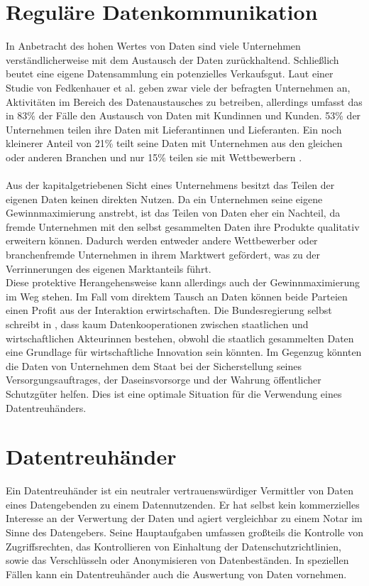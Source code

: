 \documentclass{scrreprt}
\begin{document}
\section{Reguläre Datenkommunikation}
In Anbetracht des hohen Wertes von Daten sind viele Unternehmen verständlicherweise mit dem Austausch der Daten zurückhaltend. Schließlich beutet eine eigene Datensammlung ein potenzielles Verkaufsgut. Laut einer Studie von Fedkenhauer et al. geben zwar viele der befragten Unternehmen an, Aktivitäten im Bereich des Datenaustausches zu betreiben, allerdings umfasst das in 83\% der Fälle den Austausch von Daten mit Kundinnen und Kunden. 53\% der Unternehmen teilen ihre Daten mit Lieferantinnen und Lieferanten. Ein noch kleinerer Anteil von 21\% teilt seine Daten mit Unternehmen aus den gleichen oder anderen Branchen und nur 15\% teilen sie mit Wettbewerbern \cite{dt-fedkenhauer2017datenaustausch}. \\\\
Aus der kapitalgetriebenen Sicht eines Unternehmens besitzt das Teilen der eigenen Daten keinen direkten Nutzen. Da ein Unternehmen seine eigene Gewinnmaximierung anstrebt, ist das Teilen von Daten eher ein Nachteil, da fremde Unternehmen mit den selbst gesammelten Daten ihre Produkte qualitativ erweitern können. Dadurch werden entweder andere Wettbewerber oder branchenfremde Unternehmen in ihrem Marktwert gefördert, was zu der Verrinnerungen des eigenen Marktanteils führt. \\
Diese protektive Herangehensweise kann allerdings auch der Gewinnmaximierung im Weg stehen. Im Fall vom direktem Tausch an Daten können beide Parteien einen Profit aus der Interaktion erwirtschaften. Die Bundesregierung selbst schreibt in \cite{dt-bundesregierung2021datenstrategie}, dass kaum Datenkooperationen zwischen staatlichen und wirtschaftlichen Akteurinnen bestehen, obwohl die staatlich gesammelten Daten eine Grundlage für wirtschaftliche Innovation sein könnten. Im Gegenzug könnten die Daten von Unternehmen dem Staat bei der Sicherstellung seines Versorgungsauftrages, der Daseinsvorsorge und der Wahrung öffentlicher Schutzgüter helfen. Dies ist eine optimale Situation für die Verwendung eines Datentreuhänders.
\section{Datentreuhänder}
\label{sec:dt}
Ein Datentreuhänder ist ein neutraler vertrauenswürdiger Vermittler von Daten eines Datengebenden zu einem Datennutzenden. Er hat selbst kein kommerzielles Interesse an der Verwertung der Daten und agiert vergleichbar zu einem Notar im Sinne des Datengebers. Seine Hauptaufgaben umfassen großteils die Kontrolle von Zugriffsrechten, das Kontrollieren von Einhaltung der Datenschutzrichtlinien, sowie das Verschlüsseln oder Anonymisieren von Datenbeständen. In speziellen Fällen kann ein Datentreuhänder auch die Auswertung von Daten vornehmen. \cite{dt-bundesregierung2021datenstrategie}\cite{dt-richter2020ddvtalk}
\end{document}
